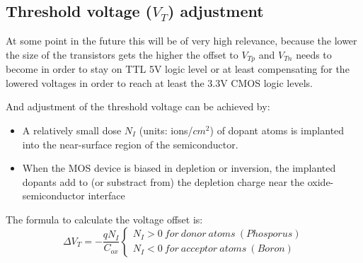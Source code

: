 \subsection{Threshold voltage ($V_T$) adjustment}
At some point in the future this will be of very high relevance, because the lower the size of the transistors gets the higher the offset to $V_{Tp}$ and $V_{Tn}$ needs to become in order to stay on TTL 5V logic level or at least compensating for the lowered voltages in order to reach at least the 3.3V CMOS logic levels.

And adjustment of the threshold voltage can be achieved by:
\begin{itemize}
\item A relatively small dose $N_I$ (units: ions/$cm^2$) of dopant atoms is implanted into the near-surface  region of the semiconductor.
\item When the MOS device is biased in depletion or inversion, the implanted dopants add to (or substract from) the depletion charge near the oxide-semiconductor interface
\end{itemize}

The formula to calculate the voltage offset is:
\begin{equation}
\Delta V_T = -\frac{q N_I}{C_{ox}} 
\left\{\begin{matrix}
N_I > 0\ for\ donor\ atoms\ (Phosporus) \\
N_I < 0\ for\ acceptor\ atoms\ (Boron)
\end{matrix}\right.
\end{equation}
